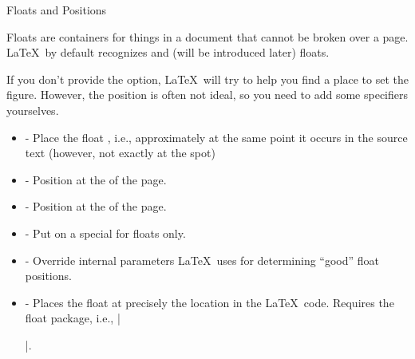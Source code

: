\begin{frame}[fragile]{Floats and Positions}

Floats are containers for things in a document that cannot be broken over a page. \LaTeX\ by default recognizes  and  (will be introduced later) floats. \medskip

If you don't provide the  option, \LaTeX\ will try to help you find a place to set the figure. However, the position is often not ideal, so you need to add some specifiers yourselves. 

\begin{itemize}
\item {} - Place the float , i.e., approximately at the same point it occurs in the source text (however, not exactly at the spot)
\item {} - Position at the  of the page.
\item {} - Position at the  of the page.
\item {} - Put on a special  for floats only.
\item \packagename{!} - Override internal parameters \LaTeX\ uses for determining ``good'' float positions.
\item {} -  Places the float at precisely the location in the \LaTeX\ code. Requires the float package, i.e., \LC|\usepackage{float}|.
\end{itemize}

\end{frame}


